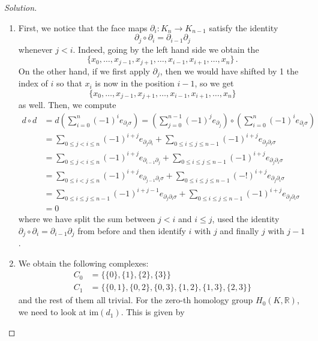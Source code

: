 \documentclass[a4paper,12pt]{article}
\newenvironment{solution}
  {\renewcommand\qedsymbol{$\blacksquare$}\begin{proof}[Solution]}
  {\end{proof}}
\theoremstyle{definition}
\begin{document}
\begin{solution}
\begin{enumerate}[label = \alph*)]
    \item First, we notice that the face maps $\partial_i \colon K_n \to K_{n-1}$ satisfy the identity 
    $$\partial_j \circ \partial_i = \partial_{i-1} \partial_j$$
    whenever $j < i$. Indeed, going by the left hand side we obtain the
    $$\{x_0, \dots , x_{j-1}, x_{j+1}, \dots , x_{i-1}, x_{i+1}, \dots , x_n\} \, .$$
    On the other hand, if we first apply $\partial_j$, then we would have shifted by 1 the index of $i$ so that $x_i$ is now in the position $i-1$, so we get 
    $$\{x_0, \dots , x_{j-1}, x_{j+1}, \dots , x_{i-1}, x_{i+1}, \dots , x_n\} $$
    as well. Then, we compute 
    \begin{align*}
        d \circ d & = d\left( \sum_{i=0}^{n} (-1)^i e_{\partial_i \sigma}\right) = \left( \sum_{j=0}^{n-1}(-1)^j e_{\partial_j}\right) \circ \left( \sum_{i=0}^{n} (-1)^i e_{\partial_i \sigma}\right)\\
        & = \sum_{0 \leq j < i \leq n}(-1)^{i+j} e_{\partial_j  \partial_i} + \sum_{0 \leq i \leq j \leq n-1}(-1)^{i+j}e_{\partial_j \partial_i \sigma} \\
        & = \sum_{0 \leq j < i \leq n} (-1)^{i+j}e_{\partial_{i-1} \partial_j} + \sum_{0 \leq i \leq j \leq n-1}(-1)^{i+j} e_{\partial_j \partial_i \sigma} \\
        & = \sum_{0 \leq i < j \leq n} (-1)^{i+j} e_{\partial_{j-1} \partial_i \sigma} + \sum_{0 \leq i \leq j \leq n-1}(-!)^{i+j}e_{\partial_j\partial_i \sigma}\\
        & = \sum_{0 \leq i \leq j \leq n-1}(-1)^{i+j-1}e_{\partial_j\partial_i \sigma} + \sum_{0 \leq i \leq j \leq n-1}(-1)^{i+j}e_{\partial_j\partial_i \sigma}\\
        & = 0
    \end{align*}
    where we have split the sum between $j <i$ and $i \leq j$, used the identity $\partial_j \circ \partial_i = \partial_{i-1} \partial_j$ from before and then identify $i$ with $j$ and finally $j$ with $j-1$. 
    \item We obtain the following complexes: 
    \begin{align*}
        C_0 & = \{ \{0\}, \{1\}, \{2\}, \{3\}\}\\
        C_1 & = \{ \{0,1\}, \{0,2\}, \{0,3\}, \{1,2\}, \{1,3\}, \{2,3\}\}
    \end{align*}
    and the rest of them all trivial. 
    For the zero-th homology group $H_0(K,\mathbb{R})$, we need to look at $\mathrm{im}(d_1)$. This is given by 

\end{enumerate}
\end{solution}
\end{document}
